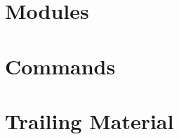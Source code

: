 \documentclass[11pt,a4paper,twoside]{report}
\begin{document}
\part{\mad Modules}                      


\part{\ptc Commands}


\part{Trailing Material}





\printindex


\end{document}
